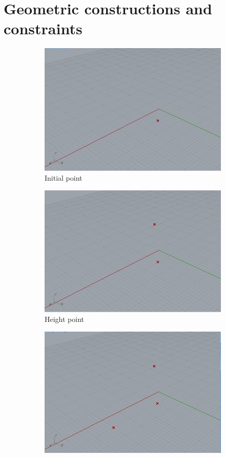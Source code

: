 \documentclass[preprint,12pt,3p]{elsarticle}
\begin{document}
\section{Geometric constructions and constraints}
\label{geometric}

\begin{figure}
\begin{subfigure}{0.3\textwidth}
  \centering
  \includegraphics[width=.9\linewidth]{a01s00.png}
  \caption{Initial point}
  \label{fig:a01s00}
\end{subfigure}%
\begin{subfigure}{0.3\textwidth}
  \centering
  \includegraphics[width=.9\linewidth]{a01s01.png}
  \caption{Height point}
  \label{fig:a01s01}
\end{subfigure}
\begin{subfigure}{0.3\textwidth}
  \centering
  \includegraphics[width=.9\linewidth]{a01s02.png}

\end{subfigure}
\end{figure}
\end{document}
